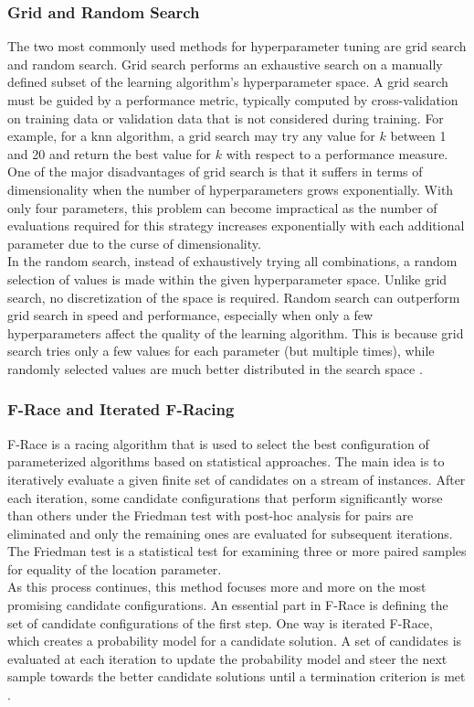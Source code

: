 \subsubsection*{Grid and Random Search}
The two most commonly used methods for hyperparameter tuning are grid search and random search. Grid search performs an exhaustive search on a manually defined subset of the learning algorithm's hyperparameter space. A grid search must be guided by a performance metric, typically computed by cross-validation on training data or validation data that is not considered during training. For example, for a knn algorithm, a grid search may try any value for $k$ between 1 and 20 and return the best value for $k$ with respect to a performance measure. One of the major disadvantages of grid search is that it suffers in terms of dimensionality when the number of hyperparameters grows exponentially. With only four parameters, this problem can become impractical as the number of evaluations required for this strategy increases exponentially with each additional parameter due to the curse of dimensionality. \\
In the random search, instead of exhaustively trying all combinations, a random selection of values is made within the given hyperparameter space. Unlike grid search, no discretization of the space is required. Random search can outperform grid search in speed and performance, especially when only a few hyperparameters affect the quality of the learning algorithm. This is because grid search tries only a few values for each parameter (but multiple times), while randomly selected values are much better distributed in the search space \autocite[][]{bergstra2012random}.
\subsubsection*{F-Race and Iterated F-Racing}
F-Race is a racing algorithm that is used to select the best configuration of parameterized algorithms based on statistical approaches. The main idea is to iteratively evaluate a given finite set of candidates on a stream of instances. After each iteration, some candidate configurations that perform significantly worse than others under the Friedman test with post-hoc analysis for pairs are eliminated and only the remaining ones are evaluated for subsequent iterations. The Friedman test is a statistical test for examining three or more paired samples for equality of the location parameter. \\
As this process continues, this method focuses more and more on the most promising candidate configurations. An essential part in F-Race is defining the set of candidate configurations of the first step. One way is iterated F-Race, which creates a probability model for a candidate solution. A set of candidates is evaluated at each iteration to update the probability model and steer the next sample towards the better candidate solutions until a termination criterion is met \autocite[][]{birattari2010f}.
